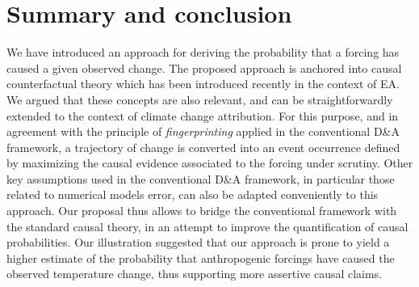 \documentclass[12pt]{article}
\newcommand{\PNS}{\textrm{PNS}}
\begin{document}
\section{Summary and conclusion}
We have introduced an approach for deriving the probability that a forcing has caused a given observed change. The proposed approach is anchored into causal counterfactual theory \citep{Pearl09} which has been introduced recently in the context of EA. We argued that these concepts are also relevant, and can be straightforwardly extended to the context of climate change attribution. For this purpose, and in agreement with the principle of \textit{fingerprinting} applied in the conventional D\&A framework, a trajectory of change is converted into an event occurrence defined by maximizing the causal evidence associated to the forcing under scrutiny. Other key assumptions used in the conventional D\&A framework, in particular those related to numerical models error, can also be adapted conveniently to this approach. Our proposal thus allows to bridge the conventional framework with the standard causal theory, in an attempt to improve the quantification of causal probabilities. Our illustration suggested that our approach is prone to yield a higher estimate of the probability that anthropogenic forcings have caused the observed temperature change, thus supporting more assertive causal claims.


\end{document}
